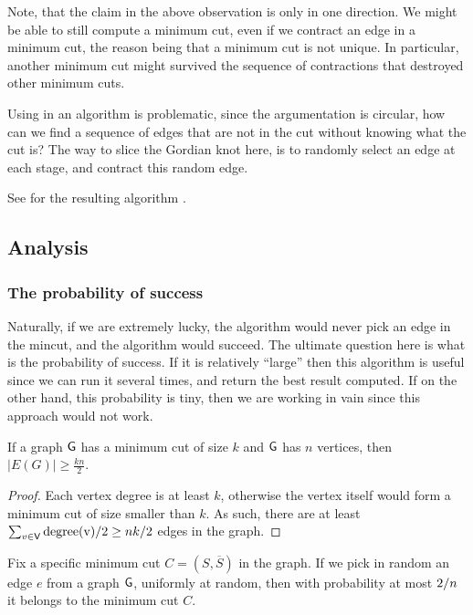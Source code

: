 Note, that the claim in the above observation is only in one
direction. We might be able to still compute a minimum cut, even if we
contract an edge in a minimum cut, the reason being that a minimum cut
is not unique. In particular, another minimum cut might survived the
sequence of contractions that destroyed other minimum cuts.


Using  in an algorithm is problematic, since the
argumentation is circular, how can we find a sequence of edges that
are not in the cut without knowing what the cut is?  The way to slice
the Gordian knot here, is to randomly select an edge at each stage,
and contract this random edge.


See  for the resulting algorithm \MinCut{}.


\subsection{Analysis}

\subsubsection{The probability of success}
Naturally, if we are extremely lucky, the algorithm would never pick
an edge in the mincut, and the algorithm would succeed. The ultimate
question here is what is the probability of success. If it is
relatively ``large'' then this algorithm is useful since we can run it
several times, and return the best result computed. If on the other
hand, this probability is tiny, then we are working in vain since this
approach would not work.

\begin{lemma}
    If a graph $\mathsf{G}$ has a minimum cut of size $k$ and $\mathsf{G}$ has
    $n$ vertices, then $|E(G)|\geq\frac{kn}{2}$.
\end{lemma}

\begin{proof}
    Each vertex degree is at least $k$, otherwise the vertex itself
    would form a minimum cut of size smaller than $k$. As such, there
    are at least $\sum_{v \in \mathsf{V}} \mathrm{degree(v)} / 2 \geq n
    k /2$ edges in the graph.
\end{proof}

\begin{lemma}
    Fix a specific minimum cut $C = (S,\overline{S})$ in the graph.
    If we pick in random an edge $e$ from a graph $\mathsf{G}$, uniformly
    at random, then with probability at most ${2}/{n}$ it belongs
    to the minimum cut $C$.
\end{lemma}

